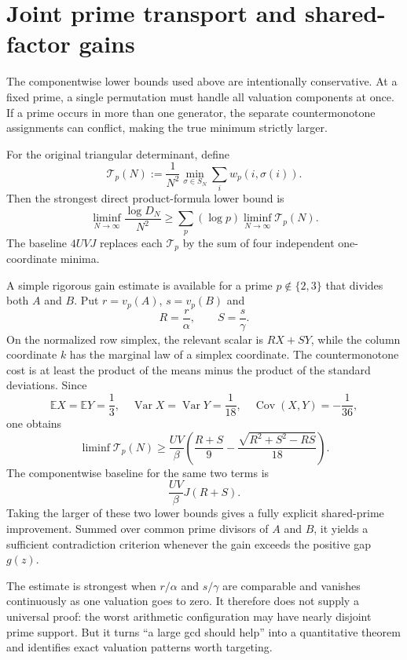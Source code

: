 \documentclass[11pt]{article}
\theoremstyle{definition}
\newcommand{\E}{\mathbb E}
\newcommand{\Var}{\operatorname{Var}}
\newcommand{\Cov}{\operatorname{Cov}}
\begin{document}
\section{Joint prime transport and shared-factor gains}

The componentwise lower bounds used above are intentionally conservative.  At
a fixed prime, a single permutation must handle all valuation components at
once.  If a prime occurs in more than one generator, the separate
countermonotone assignments can conflict, making the true minimum strictly
larger.

For the original triangular determinant, define
\[
 \mathcal T_p(N):=\frac1{N^2}
 \min_{\sigma\in S_N}\sum_i w_p(i,\sigma(i)).
\]
Then the strongest direct product-formula lower bound is
\[
 \liminf_{N\to\infty}\frac{\log D_N}{N^2}
 \ge\sum_p(\log p)\liminf_{N\to\infty}\mathcal T_p(N).
\]
The baseline $4UVJ$ replaces each $\mathcal T_p$ by the sum of four independent
one-coordinate minima.

A simple rigorous gain estimate is available for a prime $p\notin\{2,3\}$ that
divides both $A$ and $B$.  Put $r=v_p(A)$, $s=v_p(B)$ and
\[
 R=\frac r\alpha,\qquad S=\frac s\gamma.
\]
On the normalized row simplex, the relevant scalar is $RX+SY$, while the
column coordinate $k$ has the marginal law of a simplex coordinate.  The
countermonotone cost is at least the product of the means minus the product of
the standard deviations.  Since
\[
 \E X=\E Y=\frac13,\quad
 \Var X=\Var Y=\frac1{18},\quad
 \Cov(X,Y)=-\frac1{36},
\]
one obtains
\begin{equation}\label{eq:overlap-bound}
 \liminf\mathcal T_p(N)
 \ge\frac{UV}{\beta}
 \left(
  \frac{R+S}{9}
  -\frac{\sqrt{R^2+S^2-RS}}{18}
 \right).
\end{equation}
The componentwise baseline for the same two terms is
\[
 \frac{UV}{\beta}J(R+S).
\]
Taking the larger of these two lower bounds gives a fully explicit shared-prime
improvement.  Summed over common prime divisors of $A$ and $B$, it yields a
sufficient contradiction criterion whenever the gain exceeds the positive
gap $g(z)$.

The estimate is strongest when $r/\alpha$ and $s/\gamma$ are comparable and
vanishes continuously as one valuation goes to zero.  It therefore does not
supply a universal proof: the worst arithmetic configuration may have nearly
disjoint prime support.  But it turns ``a large gcd should help'' into a
quantitative theorem and identifies exact valuation patterns worth targeting.
\end{document}
